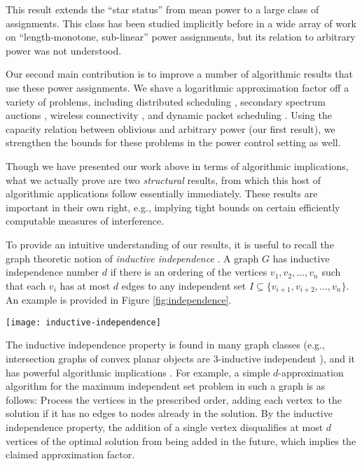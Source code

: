 \documentclass[11pt]{amsart}
\begin{document}
This result
extends the ``star status'' from mean
power to a large class of assignments. This class has been studied
implicitly before in a wide array of work \cite{SODA11,HM11a,DBLP:conf/spaa/HoeferKV11,KV10} on ``length-monotone, sub-linear'' power assignments, but
its relation to arbitrary power was not understood.

Our second main contribution is to 
improve a number of algorithmic results that use these power assignments. 
We shave a logarithmic approximation factor off
a variety of problems, including distributed scheduling \cite{KV10}, secondary spectrum auctions \cite{DBLP:conf/spaa/HoeferKV11}, wireless connectivity \cite{PODC12,HM12,MoWa06}, 
and dynamic packet scheduling \cite{sirocco12,kesselheimStability}.  Using
the capacity relation between oblivious and arbitrary power (our first result), we 
strengthen the bounds for these problems in the power control setting as well.

Though we have presented our work above in terms of algorithmic implications,
what we actually prove are two \emph{structural} results, from which this host
of algorithmic applications follow essentially immediately. 
These results are important in their own right, e.g., implying tight bounds on 
certain efficiently computable measures of interference.

To provide an intuitive understanding of our results, it is useful to
recall the graph theoretic notion of \emph{inductive independence} 
\cite{DBLP:journals/talg/YeB12}.  A graph $G$ has inductive
independence number $d$ if there is an ordering of the vertices $v_1,
v_2, \ldots, v_n$ such that each $v_i$ has at most $d$ edges to any 
independent set $I \subseteq \{v_{i+1}, v_{i+2},\ldots,v_n\}$. An example is provided in Figure \ref{fig:independence}.
\begin{figure*}[ht]
	\begin{center}
		\texttt{[image: inductive-independence]}
	\end{center}
	\caption{The graph on the left has inductive independence number $1$, the graph on the right has inductive independence number $2$.}\label{fig:independence}
\end{figure*}
The inductive independence property is found in many graph classes
(e.g., intersection graphs of convex planar objects are 3-inductive
independent \cite{DBLP:journals/talg/YeB12}), and it has powerful algorithmic
implications
\cite{Halldorsson00approximationsof,DBLP:conf/spaa/HoeferKV11,DBLP:journals/talg/YeB12}.
For example, a simple $d$-approximation algorithm for the maximum
independent set problem in such a graph is as follows: Process the
vertices in the prescribed order, adding each vertex to the solution
if it has no edges to nodes already in the solution.  By the inductive
independence property, the addition of a single vertex disqualifies at
most $d$ vertices of the optimal solution from being added in the future,
which implies the claimed approximation factor.
\end{document}
